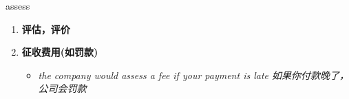 
\begin{frame}
{\huge assess}
\begin{center}
\begin{enumerate}\Large
  \item \textbf{评估，评价}
  \item \textbf{征收费用(如罚款)}
  \begin{itemize}
    \item \em{\Large{the company would assess a fee if your payment is late 如果你付款晚了，公司会罚款}}
  \end{itemize}
\end{enumerate}
\end{center}
\end{frame}
